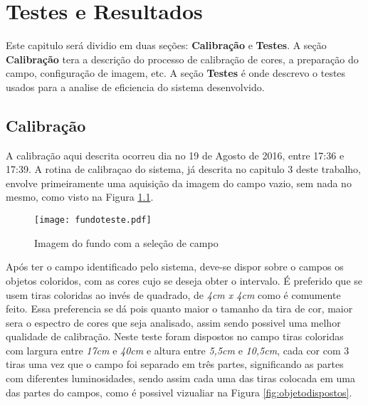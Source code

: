 % 
\chapter{Testes e Resultados} 
Este capitulo será dividio em duas seções: \textbf{Calibração} e \textbf{Testes}. A seção \textbf{Calibração} tera a descrição do processo de calibração de cores, a preparação do campo, configuração de imagem, etc. A seção \textbf{Testes} é onde descrevo o testes usados para a analise de eficiencia do sistema desenvolvido.
\section{Calibração}
A calibração aqui descrita ocorreu dia no 19 de Agosto de 2016, entre 17:36 e 17:39.
A rotina de calibraçao do sistema, já descrita no capitulo 3 deste trabalho, envolve primeiramente uma aquisição da imagem do campo vazio, sem nada no mesmo, como visto na Figura \ref{campovazio}.
\begin{figure}[H]
		\centering
		\texttt{[image: fundoteste.pdf]}
		\caption{Imagem do fundo com a seleção de campo}
		\label{campovazio}
	\end{figure}
Após ter o campo identificado pelo sistema, deve-se dispor sobre o campos os objetos coloridos, com as cores cujo se deseja obter o intervalo. É preferido que se usem tiras coloridas ao invés de quadrado, de \textit{4cm x 4cm} como é comumente feito. Essa preferencia se dá pois quanto maior o tamanho da tira de cor, maior sera o espectro de cores que seja analisado, assim sendo possivel uma melhor qualidade de calibração.
Neste teste foram dispostos no campo tiras coloridas com largura entre \textit{17cm} e \textit{40cm} e altura entre \textit{5,5cm} e \textit{10,5cm}, cada cor com 3 tiras uma vez que o campo foi separado em três partes, significando as partes com diferentes luminosidades, sendo assim cada uma das tiras colocada em uma das partes do campos, como é possivel vizualiar na Figura \ref{fig:objetodispostos}.
	
